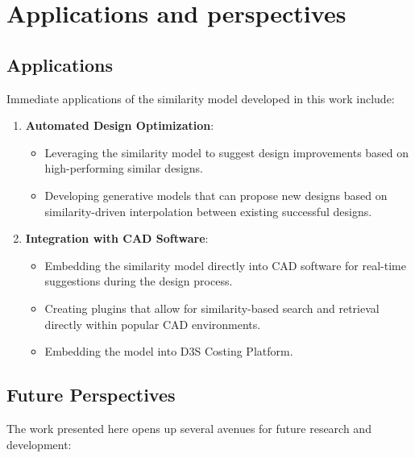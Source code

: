 \chapter{Applications and perspectives}
\label{chap:applications}
\section{Applications}

Immediate applications of the similarity model developed in this work include:

\begin{enumerate}
    \item \textbf{Automated Design Optimization}:
    \begin{itemize}
        \item Leveraging the similarity model to suggest design improvements based on high-performing similar designs.
        \item Developing generative models that can propose new designs based on similarity-driven interpolation between existing successful designs.
    \end{itemize}

    \item \textbf{Integration with CAD Software}:
    \begin{itemize}
        \item Embedding the similarity model directly into CAD software for real-time suggestions during the design process.
        \item Creating plugins that allow for similarity-based search and retrieval directly within popular CAD environments.
        \item Embedding the model into D3S Costing Platform.
    \end{itemize}
\end{enumerate}

\section{Future Perspectives}
\label{sec:future-perspectives}

The work presented here opens up several avenues for future research and development:

